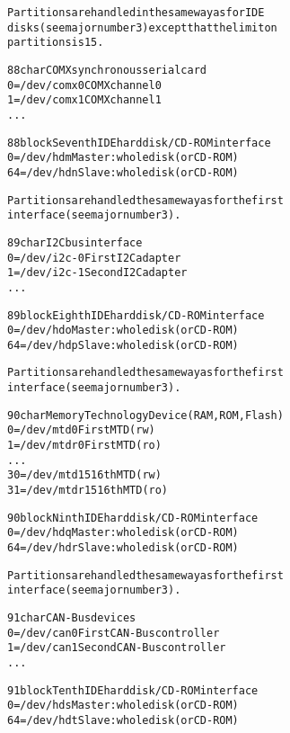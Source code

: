 \documentclass[a4paper,8pt,english]{sphinxmanual}
\begin{document}
\begin{alltt}
                Partitions are handled in the same way as for IDE
                disks (see major number 3) except that the limit on
                partitions is 15.

  88 char       COMX synchronous serial card
                  0 = /dev/comx0        COMX channel 0
                  1 = /dev/comx1        COMX channel 1
                    ...

  88 block      Seventh IDE hard disk/CD-ROM interface
                  0 = /dev/hdm          Master: whole disk (or CD-ROM)
                 64 = /dev/hdn          Slave: whole disk (or CD-ROM)

                Partitions are handled the same way as for the first
                interface (see major number 3).

  89 char       I2C bus interface
                  0 = /dev/i2c-0        First I2C adapter
                  1 = /dev/i2c-1        Second I2C adapter
                    ...

  89 block      Eighth IDE hard disk/CD-ROM interface
                  0 = /dev/hdo          Master: whole disk (or CD-ROM)
                 64 = /dev/hdp          Slave: whole disk (or CD-ROM)

                Partitions are handled the same way as for the first
                interface (see major number 3).

  90 char       Memory Technology Device (RAM, ROM, Flash)
                  0 = /dev/mtd0         First MTD (rw)
                  1 = /dev/mtdr0        First MTD (ro)
                    ...
                 30 = /dev/mtd15        16th MTD (rw)
                 31 = /dev/mtdr15       16th MTD (ro)

  90 block      Ninth IDE hard disk/CD-ROM interface
                  0 = /dev/hdq          Master: whole disk (or CD-ROM)
                 64 = /dev/hdr          Slave: whole disk (or CD-ROM)

                Partitions are handled the same way as for the first
                interface (see major number 3).

  91 char       CAN-Bus devices
                  0 = /dev/can0         First CAN-Bus controller
                  1 = /dev/can1         Second CAN-Bus controller
                    ...

  91 block      Tenth IDE hard disk/CD-ROM interface
                  0 = /dev/hds          Master: whole disk (or CD-ROM)
                 64 = /dev/hdt          Slave: whole disk (or CD-ROM)


\end{alltt}
\end{document}
